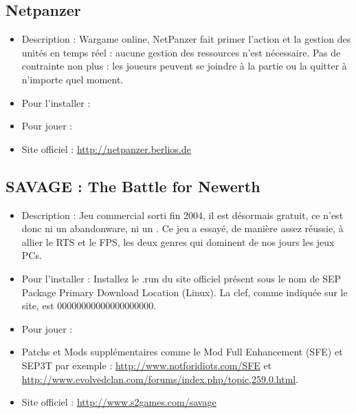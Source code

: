 \subsection{Netpanzer}
\begin{itemize}
\begingroup
{}
\item Description : Wargame online, NetPanzer fait primer l'action et la gestion des unités en temps réel : aucune gestion des ressources n'est nécessaire. Pas de contrainte non plus : les joueurs peuvent se joindre à la partie ou la quitter à n'importe quel moment.{\par}
\item Pour l'installer : 
\item Pour jouer : 
\item Site officiel : \url{http://netpanzer.berlios.de}{\par}
\endgroup
\end{itemize}
\subsection{SAVAGE : The Battle for Newerth}
\begin{itemize}
\begingroup
{}
\item Description : Jeu commercial sorti fin 2004, il est désormais gratuit, ce n'est donc ni un abandonware, ni un . Ce jeu a essayé, de manière assez réussie, à allier le RTS et le FPS, les deux genres qui dominent de nos jours les jeux PCs.{\par}
\endgroup
\item Pour l'installer : Installez le .run du site officiel présent sous le nom de SEP Package Primary Download Location (Linux). La clef, comme indiquée sur le site, est 00000000000000000000.{\par}
\item Pour jouer : 
\item Patchs et Mods supplémentaires comme le Mod Full Enhancement (SFE) et SEP3T par exemple : \url{http://www.notforidiots.com/SFE} et \url{http://www.evolvedclan.com/forums/index.php/topic,259.0.html}.{\par}
\item Site officiel : \url{http://www.s2games.com/savage}{\par}
\end{itemize}
